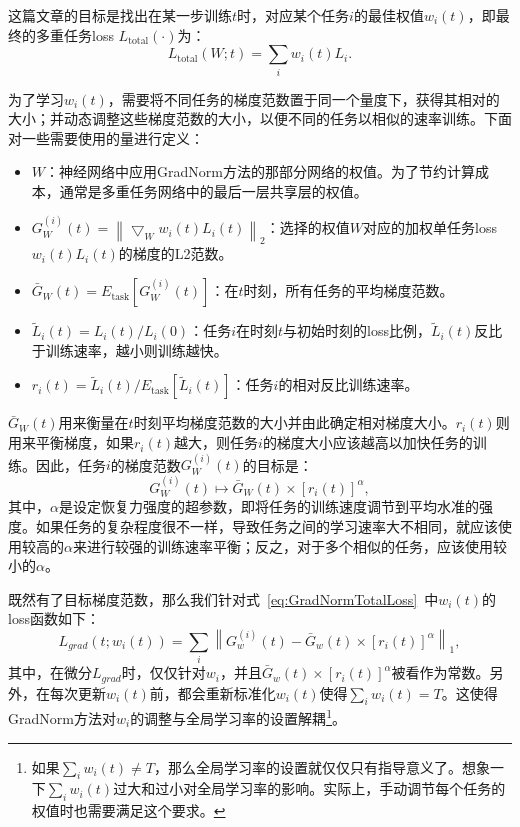 \documentclass{ctexart}
\begin{document}
这篇文章的目标是找出在某一步训练$t$时，对应某个任务$i$的最佳权值$w_i(t)$，即最终的多重任务loss $L_\mathrm{total}(\cdot)$为：
\begin{equation}
    \label{eq:GradNormTotalLoss}
    L_\mathrm{total}(W;t) = \sum_i w_i(t) L_i.
\end{equation}

为了学习$w_i(t)$，需要将不同任务的梯度范数置于同一个量度下，获得其相对的大小；并动态调整这些梯度范数的大小，以便不同的任务以相似的速率训练。下面对一些需要使用的量进行定义：
\begin{itemize}
    \item $W$：神经网络中应用GradNorm方法的那部分网络的权值。为了节约计算成本，通常是多重任务网络中的最后一层共享层的权值。
    \item $G_{W}^{(i)}(t) =\left \| \bigtriangledown_{W}w_{i}(t)L_{i}(t) \right \|_{2}$：选择的权值$W$对应的加权单任务loss\ $w_{i}(t)L_{i}(t)$的梯度的L2范数。
    \item $\bar{G}_{W}(t)=E_\mathrm{task}[G_{W}^{(i)}(t)]$：在$t$时刻，所有任务的平均梯度范数。
    \item $\tilde{L}_{i}(t)={L_{i}(t)}/{L_{i}(0)}$：任务$i$在时刻$t$与初始时刻的loss比例，$\tilde{L}_{i}(t)$反比于训练速率，越小则训练越快。 %
    \item $r_{i}(t)=\tilde{L}_{i}(t)/E_\mathrm{task}[\tilde{L}_{i}(t)]$：任务$i$的相对反比训练速率。
\end{itemize}

$\bar{G}_{W}(t)$用来衡量在$t$时刻平均梯度范数的大小并由此确定相对梯度大小。$r_{i}(t)$则用来平衡梯度，如果$r_{i}(t)$越大，则任务$i$的梯度大小应该越高以加快任务的训练。因此，任务$i$的梯度范数$G_{W}^{(i)}(t)$的目标是：
\begin{equation}
    G_{W}^{(i)}(t) \mapsto \bar{G}_W(t) \times [r_i(t)]^\alpha, 
\end{equation}
其中，$\alpha$是设定恢复力强度的超参数，即将任务的训练速度调节到平均水准的强度。如果任务的复杂程度很不一样，导致任务之间的学习速率大不相同，就应该使用较高的$\alpha$来进行较强的训练速率平衡；反之，对于多个相似的任务，应该使用较小的$\alpha$。

既然有了目标梯度范数，那么我们针对式~\ref{eq:GradNormTotalLoss}~中$w_i(t)$的loss函数如下：
\begin{equation}
    L_{grad}(t;w_{i}(t))=\sum_{i}\left \| G_{w}^{(i)}(t)-\bar{G}_{w}(t) \times [r_{i}(t)]^{\alpha} \right \|_{1},
\end{equation}
其中，在微分$L_{grad}$时，仅仅针对$w_i$，并且$\bar{G}_{w}(t)\times[r_{i}(t)]^{\alpha}$被看作为常数。另外，在每次更新$w_i(t)$前，都会重新标准化$w_i(t)$使得$\sum_{i}w_{i}(t)=T$。这使得GradNorm方法对$w_i$的调整与全局学习率的设置解耦\footnote{如果$\sum_{i}w_{i}(t)\neq T$，那么全局学习率的设置就仅仅只有指导意义了。想象一下$\sum_{i}w_{i}(t)$过大和过小对全局学习率的影响。实际上，手动调节每个任务的权值时也需要满足这个要求。}。
\end{document}
